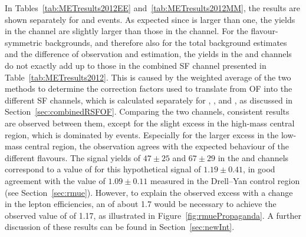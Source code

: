 
In Tables~\ref{tab:METresults2012EE} and~\ref{tab:METresults2012MM}, the results are shown separately for \EE and \MM events. As expected since \rmue is larger than one, the yields in the \MM channel are slightly larger than those in the \EE channel. For the flavour-symmetric backgrounds, and therefore also for the total background estimates and the difference of observation and estimation, the yields in the \EE and \MM channels do not exactly add up to those in the combined SF channel presented in Table~\ref{tab:METresults2012}. This is caused by the weighted average of the two methods to determine the correction factors used to translate from OF into the different SF channels, which is calculated separately for \Rsfof, \Reeof, and \Rmmof, as discussed in Section~\ref{sec:combinedRSFOF}. Comparing the two channels, consistent results are observed between them, except for the slight excess in the high-mass central region, which is dominated by \EE events. Especially for the larger excess in the low-mass central region, the observation agrees with the expected behaviour of the different flavours. The signal yields of $47\pm25$ and $67\pm29$ in the \EE and \MM channels correspond to a value of \rmue for this hypothetical signal of $1.19\pm0.41$, in good agreement with the value of $1.09\pm0.11$ measured in the Drell--Yan control region (see Section~\ref{sec:rmue}). However, to explain the observed excess with a change in the lepton efficiencies, an \rmue of about 1.7 would be necessary to achieve the observed value of  \Rsfof of 1.17, as illustrated in Figure~\ref{fig:rmuePropaganda}. A further discussion of these results can be found in Section~\ref{sec:newInt}.




